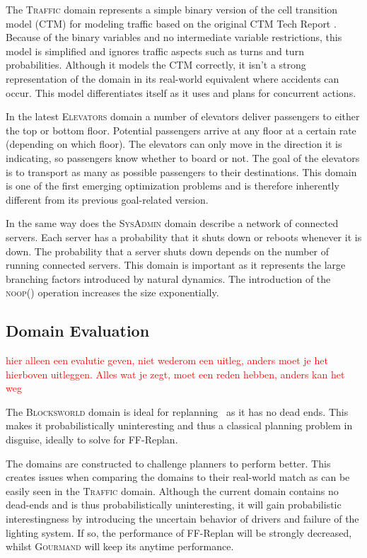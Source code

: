 \documentclass[runningheads,a4paper]{llncs}
\newcommand\myworries[1]{\textcolor{red}{#1}}
\begin{document}
The \textsc{Traffic} domain represents a simple binary version of the cell transition model
(CTM) for modeling traffic based on the original CTM Tech Report
\cite{sanner2011traffic}. Because of the binary variables and no intermediate
variable restrictions, this model is simplified and ignores traffic aspects
such as turns and turn probabilities. Although it models the CTM correctly, it isn't a strong
representation of the domain in its real-world equivalent where accidents can occur.
This model differentiates itself as it uses and plans for concurrent actions.

In the latest \textsc{Elevators} domain a number of elevators deliver passengers to either the top or bottom floor. Potential
passengers arrive at any floor at a certain rate (depending on which floor).
The elevators can only move in the direction it is indicating, so passengers
know whether to board or not. The goal of the elevators is to transport as many
as possible passengers to their destinations. This domain is one of the first emerging
optimization problems and is therefore inherently different from its previous goal-related version.

In the same way does the \textsc{SysAdmin} domain describe a network of connected servers. Each server has
a probability that it shuts down or reboots whenever it is down. The probability that a server shuts down depends on the number of
running connected servers. This domain is important as it represents the large branching factors introduced by natural dynamics. The introduction
of the \textsc{noop()} operation increases the size exponentially.

\subsection{Domain Evaluation}
\myworries{hier alleen een evalutie geven, niet wederom een uitleg, anders moet je het hierboven uitleggen. Alles wat je zegt, moet een reden hebben, anders kan het weg}

The \textsc{Blocksworld} domain is ideal for
replanning~\cite{FFReplan, little2007probvsreplan} as it has no dead ends. This makes it
probabilistically uninteresting and thus a classical planning problem in disguise, ideally to solve for FF-Replan.

The domains are constructed to challenge planners to perform
better. This creates issues when comparing the domains to their real-world match as can be easily seen
in the \textsc{Traffic} domain. Although the current domain contains no dead-ends and is thus probabilistically
uninteresting, it will gain probabilistic interestingness by introducing the uncertain behavior of drivers and failure
of the lighting system. If so, the performance of FF-Replan will be strongly decreased, whilst \textsc{Gourmand} will keep its anytime performance.
\end{document}
